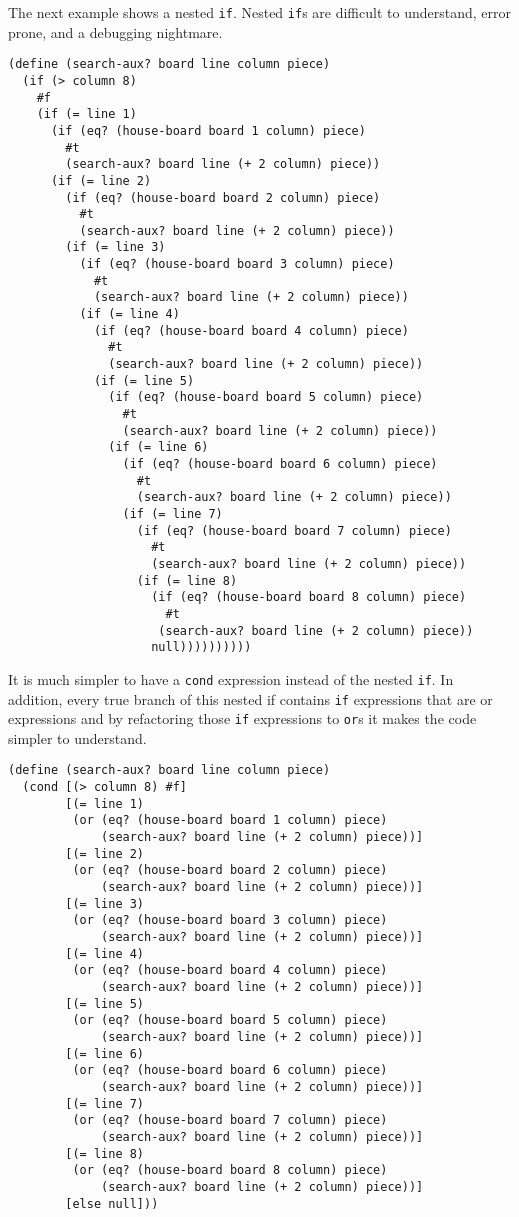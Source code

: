 The next example shows a nested {\tt if}. Nested {\tt if}s are
 difficult to understand, error prone, and a debugging nightmare.
\begin{lstlisting}
(define (search-aux? board line column piece)
  (if (> column 8)
    #f
    (if (= line 1)
      (if (eq? (house-board board 1 column) piece)
        #t
        (search-aux? board line (+ 2 column) piece))
      (if (= line 2)
        (if (eq? (house-board board 2 column) piece)
          #t
          (search-aux? board line (+ 2 column) piece))
        (if (= line 3)
          (if (eq? (house-board board 3 column) piece)
            #t
            (search-aux? board line (+ 2 column) piece))
          (if (= line 4)
            (if (eq? (house-board board 4 column) piece)
              #t
              (search-aux? board line (+ 2 column) piece))
            (if (= line 5)
              (if (eq? (house-board board 5 column) piece)
                #t
                (search-aux? board line (+ 2 column) piece))
              (if (= line 6)
                (if (eq? (house-board board 6 column) piece)
                  #t
                  (search-aux? board line (+ 2 column) piece))
                (if (= line 7)
                  (if (eq? (house-board board 7 column) piece)
                    #t
                    (search-aux? board line (+ 2 column) piece))
                  (if (= line 8)
                    (if (eq? (house-board board 8 column) piece)
                      #t
                     (search-aux? board line (+ 2 column) piece))
                    null))))))))))
\end{lstlisting}

It is much simpler to have a {\tt cond} expression instead of the nested {\tt if}.
In addition, every true branch of this nested if contains {\tt if} expressions that are
or expressions and by refactoring those {\tt if} expressions to {\tt or}s it makes the code
simpler to understand.


\begin{lstlisting}
(define (search-aux? board line column piece)
  (cond [(> column 8) #f]
        [(= line 1)
         (or (eq? (house-board board 1 column) piece)
             (search-aux? board line (+ 2 column) piece))]
        [(= line 2)
         (or (eq? (house-board board 2 column) piece)
             (search-aux? board line (+ 2 column) piece))]
        [(= line 3)
         (or (eq? (house-board board 3 column) piece)
             (search-aux? board line (+ 2 column) piece))]
        [(= line 4)
         (or (eq? (house-board board 4 column) piece)
             (search-aux? board line (+ 2 column) piece))]
        [(= line 5)
         (or (eq? (house-board board 5 column) piece)
             (search-aux? board line (+ 2 column) piece))]
        [(= line 6)
         (or (eq? (house-board board 6 column) piece)
             (search-aux? board line (+ 2 column) piece))]
        [(= line 7)
         (or (eq? (house-board board 7 column) piece)
             (search-aux? board line (+ 2 column) piece))]
        [(= line 8)
         (or (eq? (house-board board 8 column) piece)
             (search-aux? board line (+ 2 column) piece))]
        [else null]))
\end{lstlisting}

